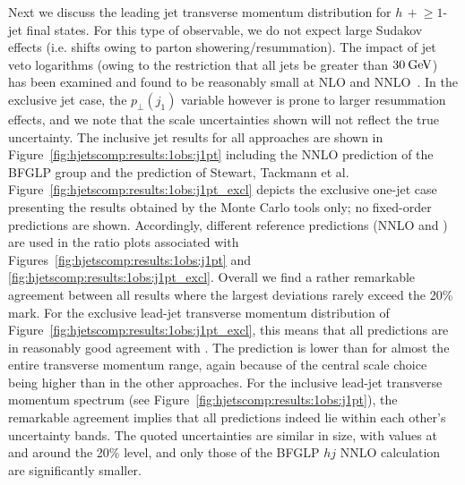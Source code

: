 Next we discuss the leading jet transverse momentum distribution for
$h\,+\!\ge\!\!1$-jet final states. For this type of observable, we do not
expect large Sudakov effects (i.e. shifts owing to parton
showering/resummation). The impact of jet veto logarithms (owing to
the restriction that all jets be greater than $30\text{\:GeV}$) has been
examined and found to be reasonably small at NLO and
NNLO~\cite{Banfi:2012jm,Banfi:2015pju}. 
In the exclusive jet case, the $p_\perp(j_1)$ variable however is
prone to larger resummation effects, and we note that the scale
uncertainties shown will not reflect the true uncertainty. The
inclusive jet results for all approaches are shown in
Figure~\ref{fig:hjetscomp:results:1obs:j1pt} including the NNLO
prediction of the BFGLP group and the prediction of Stewart, Tackmann
et al. Figure~\ref{fig:hjetscomp:results:1obs:j1pt_excl} depicts the
exclusive one-jet case presenting the results obtained by the Monte
Carlo tools only; no fixed-order predictions are shown. Accordingly,
different reference predictions (NNLO and \Powheg) are used in the
ratio plots associated with
Figures~\ref{fig:hjetscomp:results:1obs:j1pt} and
\ref{fig:hjetscomp:results:1obs:j1pt_excl}. 
Overall we find a rather remarkable agreement
between all results where the largest deviations rarely exceed the
20\% mark. For the exclusive lead-jet transverse momentum distribution
of Figure~\ref{fig:hjetscomp:results:1obs:j1pt_excl}, this means that
all predictions are in reasonably good agreement with \Powheg. The
\MGaMC prediction is lower than \Powheg for almost the entire
transverse momentum range, again because of the central scale choice
being higher than in the other approaches. For the inclusive lead-jet
transverse momentum spectrum (see
Figure~\ref{fig:hjetscomp:results:1obs:j1pt}), the remarkable
agreement implies that all predictions indeed lie within each other's
uncertainty bands. The quoted uncertainties are similar in size, with
values at and around the 20\% level, and only those of the BFGLP $hj$ NNLO
calculation are significantly smaller. 

